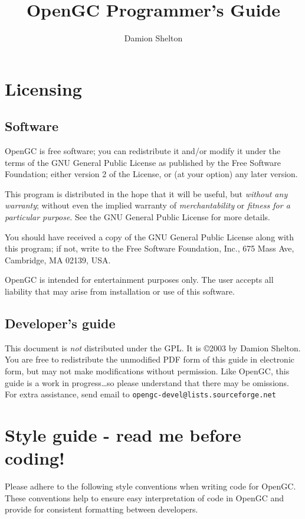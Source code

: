 \documentclass[11pt]{article}
\begin{document}
\title{OpenGC Programmer's Guide}
\author{Damion Shelton}
\date{}
\maketitle

\section{Licensing}
\subsection{Software}
OpenGC is free software; you can redistribute it and/or modify it under the terms of the GNU General Public License as published by the Free Software Foundation; either version 2 of the License, or (at your option) any later version.

This program is distributed in the hope that it will be useful, but \emph{without any warranty}; without even the implied warranty of \emph{merchantability} or \emph{fitness for a particular purpose}. See the GNU General Public License for more details.

You should have received a copy of the GNU General Public License along with this program; if not, write to the Free Software Foundation, Inc., 675 Mass Ave, Cambridge, MA 02139, USA.
  
OpenGC is intended for entertainment purposes only. The user accepts all liability that may arise from installation or use of this software.

\subsection{Developer's guide}
This document is \emph{not} distributed under the GPL. It is \copyright 2003 by Damion Shelton. You are free to redistribute the unmodified PDF form of this guide in electronic form, but may not make modifications without permission. Like OpenGC, this guide is a work in progress\dots so please understand that there may be omissions. For extra assistance, send email to \texttt{opengc-devel@lists.sourceforge.net}

\section{Style guide - read me before coding!}

Please adhere to the following style conventions when writing code for OpenGC. These conventions help to ensure easy interpretation of code in OpenGC and provide for consistent formatting between developers.
\end{document}
